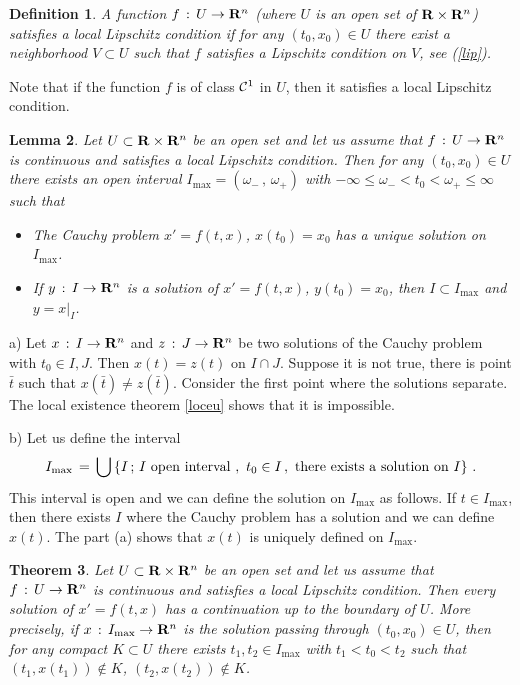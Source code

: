 \documentclass[12pt]{report}
\newcommand{\calC}{{\cal C}}
\newcommand{\bR}{{\bf R}}
\newtheorem{theorem}{Theorem}[section]
\newtheorem{lemma}[theorem]{Lemma}
\newtheorem{definition}[theorem]{Definition}
\newcommand{\proof}{\noindent {\em Proof:~}}
\def\eqref#1{(\ref{#1})}
\def\qed{\hbox{\hskip 6pt\vrule width6pt height7pt depth1pt
    \hskip1pt}\bigskip}
\def\to{\rightarrow}
\begin{document}
\begin{definition}\label{loclip}
{\rm 
A function $f\,:\, U \to \bR^n$ (where $U$ is an open set of $\bR
\times \bR^n$) satisfies a {\em local Lipschitz condition} if for any
$(t_0, x_0) \in U$ there exist a neighborhood $V \subset U$ such that
$f$ satisfies a Lipschitz condition on $V$, see \eqref{lip}.  }
\end{definition}

Note that if the function $f$ is of class $\calC^1$ in $U$, then it satisfies a
local Lipschitz condition.


\begin{lemma} Let $U \subset \bR\times \bR^n$ be an open set and let us 
assume that
 $f\,:\, U \to \bR^n$ is continuous and satisfies a local Lipschitz
 condition. Then for any $(t_0,x_0) \in U$ there exists an open
 interval $I_{\max} = (\omega_- \,,\, \omega_+)$ with $-\infty \le
 \omega_- < t_0 < \omega_+ \le \infty$ such that
 \begin{itemize}
 \item The Cauchy problem $x'=f(t,x)$, $x(t_0)=x_0$ has a unique
 solution on $I_{\max}$.
 \item If $y\,:\, I \to \bR^n$ is a solution of $x'=f(t,x)$,
 $y(t_0)=x_0$, then $I \subset I_{\max}$ and $y = x|_I$.
 \end{itemize}
 \end{lemma}

\proof a) Let $x\,:\, I \to \bR^n$ and $z\,:\, J \to \bR^n$ be two
solutions of the Cauchy problem with $t_0 \in I,J$. Then $x(t) = z(t)$
on $I \cap J$.  Suppose it is not true, there is point $\bar{t}$ such
that $x(\bar{t}) \not = z(\bar{t})$. Consider the first point where
the solutions separate. The local existence theorem \ref{loceu} shows
that it is impossible.

b) Let us define the interval
\begin{equation}
I_{\max} \,=\, \bigcup \left\{ I\,;\, I {\rm ~open~interval}\,\,,\,\, t_0 \in
I\,, {\rm ~there~exists~a~solution~on~} I \right\} \,.
\end{equation}
This interval is open and we can define the solution on $I_{\max}$ as
follows. If $t\in I_{\max}$, then there exists $I$ where the Cauchy
problem has a solution and we can define $x(t)$. The part (a) shows
that $x(t)$ is uniquely defined on $I_{\max}$. \hfill \qed


\begin{theorem}\label{contsol} Let $U \subset \bR\times \bR^n$ be an open 
set and let us assume that
$f\,:\, U \to \bR^n$ is continuous and satisfies a local Lipschitz
condition. Then every solution of $x'=f(t,x)$ has a continuation up to
the boundary of $U$. More precisely, if $x\,:\, I_{\max} \to \bR^n$ is
the solution passing through $(t_0,x_0) \in U$, then for any compact
$K \subset U$ there exists $t_1, t_2 \in I_{\max}$ with $t_1 < t_0 <
t_2$ such that $(t_1, x(t_1)) \notin K$, $(t_2, x(t_2)) \notin K$.
\end{theorem}
\end{document}
